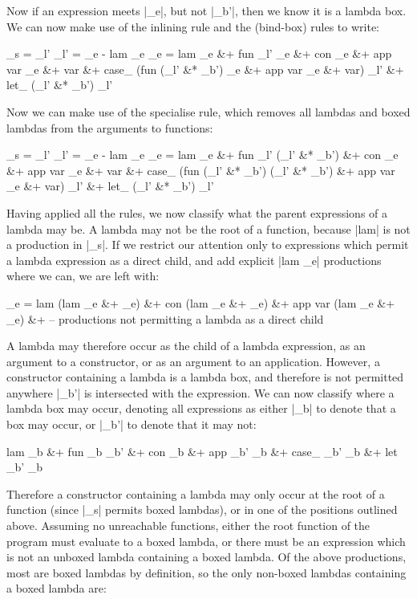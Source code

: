 \documentclass[preprint]{sigplanconf}
\begin{document}
Now if an expression meets |_e|, but not |_b'|, then we know it is a lambda box. We can now make use of the inlining rule and the (bind-box) rules to write:

\begin{code}
_s   = _l'
_l' = _e - lam _e
_e =  lam _e &+ fun _l' _e &+ con _e &+ app var _e &+ var &+
      case_ (fun (_l' &* _b') _e &+ app var _e &+ var) _l' &+ let_ (_l' &* _b') _l'
\end{code}

Now we can make use of the specialise rule, which removes all lambdas and boxed lambdas from the arguments to functions:

\begin{code}
_s   = _l'
_l' = _e - lam _e
_e =  lam _e &+ fun _l' (_l' &* _b') &+ con _e &+ app var _e &+ var &+
      case_ (fun (_l' &* _b') (_l' &* _b') &+ app var _e &+ var) _l' &+ let_ (_l' &* _b') _l'
\end{code}

Having applied all the rules, we now classify what the parent expressions of a lambda may be. A lambda may not be the root of a function, because |lam| is not a production in |_s|. If we restrict our attention only to expressions which permit a lambda expression as a direct child, and add explicit |lam _e| productions where we can, we are left with:

\begin{code}
_e =  lam (lam _e &+ _e) &+ con (lam _e &+ _e) &+ app var (lam _e &+ _e) &+
      -- productions not permitting a lambda as a direct child
\end{code}

A lambda may therefore occur as the child of a lambda expression, as an argument to a constructor, or as an argument to an application. However, a constructor containing a lambda is a lambda box, and therefore is not permitted anywhere |_b'| is intersected with the expression. We can now classify where a lambda box may occur, denoting all expressions as either |_b| to denote that a box may occur, or |_b'| to denote that it may not:

\begin{code}
lam _b &+ fun _b _b' &+ con _b &+ app _b' _b &+ case_ _b' _b &+ let _b' _b
\end{code}

Therefore a constructor containing a lambda may only occur at the root of a function (since |_s| permits boxed lambdas), or in one of the positions outlined above. Assuming no unreachable functions, either the root function of the program must evaluate to a boxed lambda, or there must be an expression which is not an unboxed lambda containing a boxed lambda. Of the above productions, most are boxed lambdas by definition, so the only non-boxed lambdas containing a boxed lambda are:
\end{document}
